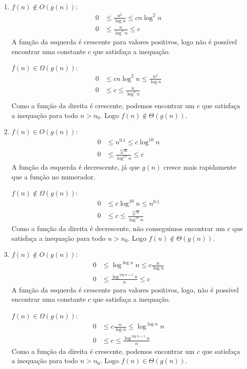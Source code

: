 \documentclass{article}
\begin{document}
\begin{enumerate}
\begin{enumerate}
		\item $f(n) \notin O(g(n))$:
		\begin{align*}
			0 &\le \frac{n^2}{\log n} \le c n \log^2 n \\
			0 &\le \frac{n}{\log^3 n} \le c
		\end{align*}
		A função  da esquerda é crescente para valores positivos, logo não é
		possível encontrar uma constante $c$ que satisfaça a inequação.

		$f(n) \in \Omega(g(n))$:
		\begin{align*}
			0 &\le c n \log^2 n \le \frac{n^2}{\log n} \\
			0 &\le c \le \frac{n}{\log^3 n} \\
		\end{align*}
		Como a função da direita é crescente, podemos encontrar um $c$ que
		satisfaça a inequação para todo $n > n_0$. Logo $f(n) \notin
		\Theta(g(n))$.

		\item $f(n) \in O(g(n))$:
		\begin{align*}
			0 &\le {n^{0.1}} \le c \log^{10} n \\
			0 &\le \frac{\sqrt[10]{n}}{\log^{10} n} \le c
		\end{align*}
		A função da esquerda é decrescente, já que $g(n)$ cresce mais
		rapidamente que a função no numerador.

		$f(n) \notin \Omega(g(n))$:
		\begin{align*}
			0 &\le c \log^{10} n \le {n^{0.1}}\\
			0 &\le c \le \frac{\sqrt[10]{n}}{\log^{10} n}
		\end{align*}
		Como a função da direita é decrescente, não conseguimos encontrar um
		$c$ que satisfaça a inequação para todo $n > n_0$. Logo $f(n) \notin
		\Theta(g(n))$.

		\item $f(n) \notin O(g(n))$:
		\begin{align*}
			0 &\le {\log ^{\log n} n} \le c \frac{n}{\log n} \\
			0 &\le \frac{\log ^{\log n + 1} n}{n} \le c
		\end{align*}
		A função da esquerda é crescente para valores positivos, logo, não é
		possível encontrar uma constante $c$ que satisfaça a inequação.

		$f(n) \in \Omega(g(n))$:
		\begin{align*}
		0 &\le  c \frac{n}{\log n} \le {\log ^{\log n} n} \\
		0 &\le c \le \frac{\log ^{\log n + 1} n}{n}
		\end{align*}
		Como a função da direita é crescente, podemos encontrar um $c$ que
		satisfaça a inequação para todo $n > n_0$. Logo $f(n) \in
		\Theta(g(n))$.


\end{enumerate}
\end{enumerate}
\end{document}

